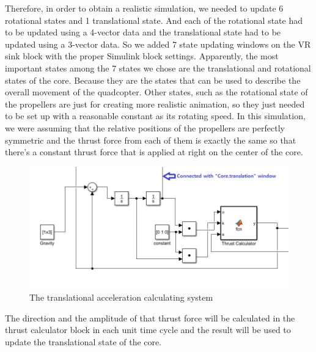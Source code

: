 \newline
\newline
Therefore, in order to obtain a realistic simulation, we needed to update 6 rotational states and 1 translational state. And each of the rotational state had to be updated using a 4-vector data and the translational state had to be updated using a 3-vector data.
So we added 7 state updating windows on the VR sink block with the proper Simulink block settings.
\newline
\newline
Apparently, the most important states among the 7 states we chose are the translational and rotational states of the core. Because they are the states that can be used to describe the overall movement of the quadcopter. 
\newline
\newline
Other states, such as the rotational state of the propellers are just for creating more realistic animation, so they just needed to be set up with a reasonable constant as its rotating speed. 
\newline
\newline
In this simulation, we were assuming that the relative positions of the propellers are perfectly symmetric and the thrust force from each of them is exactly the same so that there’s a constant thrust force that is applied at right on the center of the core.
\begin{figure}[h]
\centering
\includegraphics[width=1.1\textwidth]{./Lin_img/5.JPG}
\caption{The translational acceleration calculating system}
\end{figure}
\newline
The direction and the amplitude of that thrust force will be calculated in the thrust calculator block in each unit time cycle and the result will be used to update the translational state of the core.
\newline
\newline
